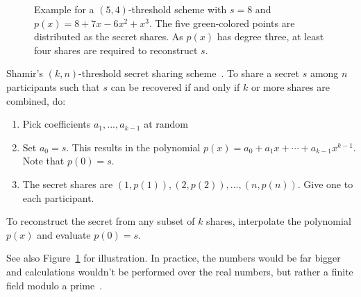 \begin{figure}
    \centering
    \caption[Plot of $(5,4)$-threshold secret sharing scheme]{
        Example for a $(5, 4)$-threshold scheme with $s=8$ and $p(x) = 8 + 7x - 6x^2 + x^3$.
        The five green-colored points are distributed as the secret shares.
        As $p(x)$ has degree three, at least four shares are required to reconstruct $s$.
    }
    \label{fig:sss}
\end{figure}

\begin{definition}
    Shamir's $(k, n)$-threshold secret sharing scheme~\cite{shamir_how_1979}.
    To share a secret $s$ among $n$ participants such that $s$ can be recovered if and only if $k$ or more shares are combined, do:
    \begin{enumerate}
        \item Pick coefficients $a_1, ..., a_{k-1}$ at random 
        \item Set $a_0 = s$. This results in the polynomial $p(x) = a_0 + a_1x + \cdots + a_{k-1}x^{k-1}$. Note that $p(0) = s$.
        \item The secret shares are $(1, p(1)), (2, p(2)), \dots, (n, p(n))$. Give one to each participant.
    \end{enumerate}
    To reconstruct the secret from any subset of $k$ shares, interpolate the polynomial $p(x)$ and evaluate $p(0) = s$. 
\end{definition}

See also Figure~\ref{fig:sss} for illustration.
In practice, the numbers would be far bigger and calculations wouldn't be performed over the real numbers, but rather a finite field modulo a prime~\cite{shamir_how_1979}.

